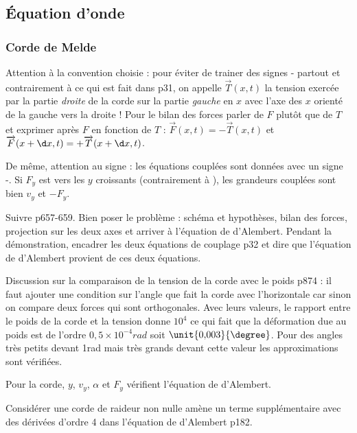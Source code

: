 \subsection{Équation d'onde}

\subsubsection{Corde de Melde}

\begin{remarque}
\important
Attention à la convention choisie : pour éviter de trainer des signes - partout et contrairement à ce qui est fait dans \cite{Brebec2004} p31, on appelle $\overrightarrow{T}(x,t)$ la tension exercée par la partie \emph{droite} de la corde sur la partie \emph{gauche} en $x$ avec l'axe des $x$ orienté de la gauche vers la droite !
Pour le bilan des forces parler de $F$ plutôt que de $T$ et exprimer après $F$ en fonction de $T$ : $\overrightarrow{F}(x,t)=-\overrightarrow{T}(x,t)$ et $\overrightarrow{F}(x+\d x,t)=+\overrightarrow{T}(x+\d x,t)$.

\noindent
De même, attention au signe : les équations couplées sont données avec un signe -.
Si $F_y$ est vers les $y$ croissants (contrairement à \cite{Brebec2004}), les grandeurs couplées sont bien $v_y$ et $-F_y$.
\end{remarque}

Suivre \cite{Olivier2000} p657-659.
Bien poser le problème : schéma et hypothèses, bilan des forces, projection sur les deux axes et arriver à l'équation de d'Alembert.
Pendant la démonstration, encadrer les deux équations de couplage \cite{Brebec2004} p32 et dire que l'équation de d'Alembert provient de ces deux équations.

\begin{remarque}
Discussion sur la comparaison de la tension de la corde avec le poids \cite{Sanz2016} p874 : il faut ajouter une condition sur l'angle que fait la corde avec l'horizontale 
car sinon on compare deux forces qui sont orthogonales.
Avec leurs valeurs, le rapport entre le poids de la corde et la tension donne $10^4$ ce qui fait que la déformation due au poids est de l'ordre $\unit{0{,}5\times10^{-4}}{rad}$ soit $\unit{0{,}003}{\degree}$.
Pour des angles très petits devant \unit{1}{rad} mais très grands devant cette valeur les approximations sont vérifiées.

\noindent
Pour la corde, $y$, $v_y$, $\alpha$ et $F_y$ vérifient l'équation de d'Alembert.

\noindent
Considérer une corde de raideur non nulle amène un terme supplémentaire avec des dérivées d'ordre 4 dans l'équation de d'Alembert \cite{Brebec2004} p182.
\end{remarque}

